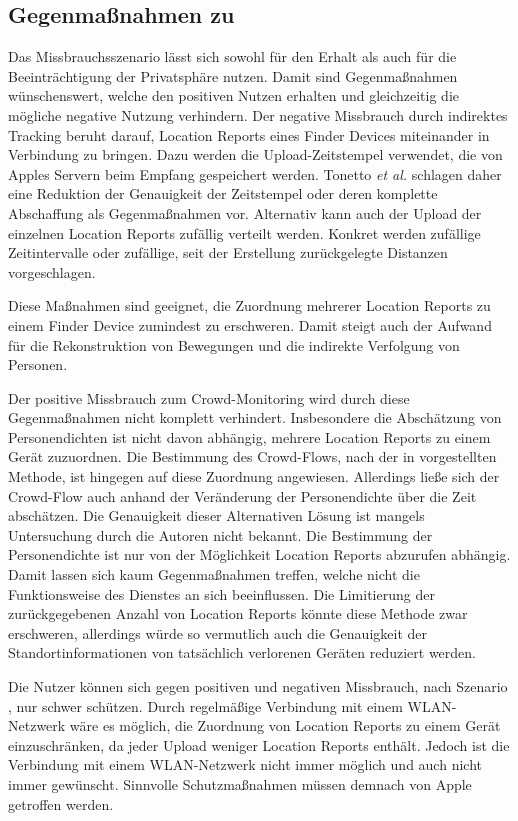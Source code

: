 \subsection{Gegenmaßnahmen zu }

Das Missbrauchsszenario  lässt sich sowohl für den Erhalt als auch für die Beeinträchtigung der Privatsphäre nutzen.
Damit sind Gegenmaßnahmen wünschenswert, welche den positiven Nutzen erhalten und gleichzeitig die mögliche negative Nutzung verhindern.
Der negative Missbrauch durch indirektes Tracking beruht darauf, Location Reports eines Finder Devices miteinander in Verbindung zu bringen.
Dazu werden die Upload-Zeitstempel verwendet, die von Apples Servern beim Empfang gespeichert werden.
Tonetto \textit{et al.} \cite{Tonetto_FindMy} schlagen daher eine Reduktion der Genauigkeit der Zeitstempel oder deren komplette Abschaffung als Gegenmaßnahmen vor.
Alternativ kann auch der Upload der einzelnen Location Reports zufällig verteilt werden.
Konkret werden zufällige Zeitintervalle oder zufällige, seit der Erstellung zurückgelegte Distanzen vorgeschlagen.

Diese Maßnahmen sind geeignet, die Zuordnung mehrerer Location Reports zu einem Finder Device zumindest zu erschweren.
Damit steigt auch der Aufwand für die Rekonstruktion von Bewegungen und die indirekte Verfolgung von Personen.

Der positive Missbrauch zum Crowd-Monitoring wird durch diese Gegenmaßnahmen nicht komplett verhindert.
Insbesondere die Abschätzung von Personendichten ist nicht davon abhängig, mehrere Location Reports zu einem Gerät zuzuordnen.
Die Bestimmung des Crowd-Flows, nach der in \cite{Tonetto_FindMy} vorgestellten Methode, ist hingegen auf diese Zuordnung angewiesen.
Allerdings ließe sich der Crowd-Flow auch anhand der Veränderung der Personendichte über die Zeit abschätzen.
Die Genauigkeit dieser Alternativen Lösung ist mangels Untersuchung durch die Autoren nicht bekannt.
Die Bestimmung der Personendichte ist nur von der Möglichkeit Location Reports abzurufen abhängig.
Damit lassen sich kaum Gegenmaßnahmen treffen, welche nicht die Funktionsweise des Dienstes an sich beeinflussen.
Die Limitierung der zurückgegebenen Anzahl von Location Reports könnte diese Methode zwar erschweren, allerdings würde so vermutlich auch die Genauigkeit der Standortinformationen von tatsächlich verlorenen Geräten reduziert werden.

Die Nutzer können sich gegen positiven und negativen Missbrauch, nach Szenario , nur schwer schützen.
Durch regelmäßige Verbindung mit einem WLAN-Netzwerk wäre es möglich, die Zuordnung von Location Reports zu einem Gerät einzuschränken, da jeder Upload weniger Location Reports enthält.
Jedoch ist die Verbindung mit einem WLAN-Netzwerk nicht immer möglich und auch nicht immer gewünscht.
Sinnvolle Schutzmaßnahmen müssen demnach von Apple getroffen werden.


